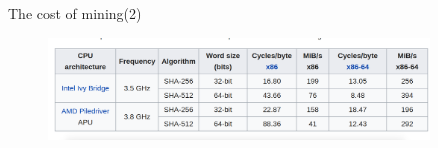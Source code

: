 \documentclass[serif]{beamer}
\begin{document}
	\begin{frame}{The cost of mining(2)}
			\begin{figure}
				\includegraphics[width=0.9\textwidth]{perf}
				\label{fig:result5}
			\end{figure}
	\end{frame}
\end{document}
